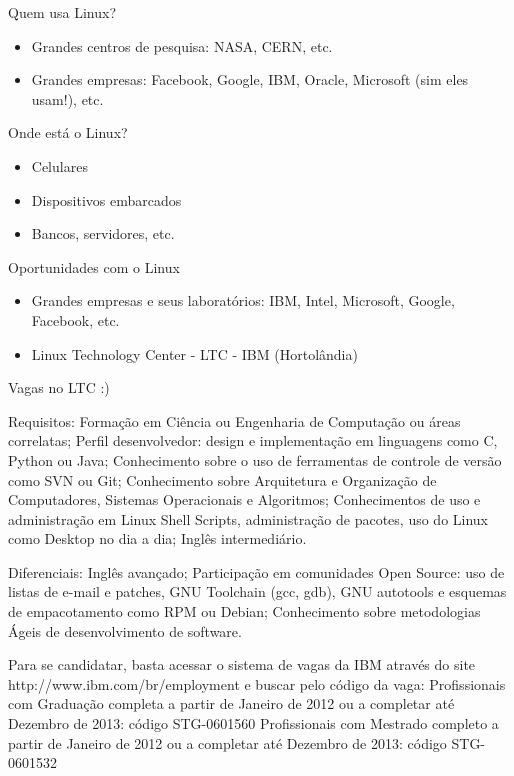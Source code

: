 \documentclass{beamer}
\begin{document}
\begin{frame}{Quem usa Linux?}
\begin{itemize}
 \item Grandes centros de pesquisa: NASA, CERN, etc.
 \item Grandes empresas: Facebook, Google, IBM, Oracle, Microsoft (sim eles usam!), etc.
\end{itemize}

\end{frame}

\begin{frame}{Onde est\'a o Linux?}
\begin{itemize}
 \item Celulares
 \item Dispositivos embarcados
 \item Bancos, servidores, etc.
\end{itemize}

\end{frame}

\begin{frame}{Oportunidades com o Linux}

\begin{itemize}
 \item Grandes empresas e seus laborat\'orios: IBM, Intel, Microsoft, Google, Facebook, etc.
 \item Linux Technology Center - LTC - IBM (Hortol\^andia)
\end{itemize}
 

\end{frame}

\begin{frame}
 
Vagas no LTC :) 


Requisitos:
Formação em Ci\^encia ou Engenharia de Computa\c{c}\~ao ou \'areas correlatas;
Perfil desenvolvedor: design e implementa\c{c}\~ao em linguagens como C, Python ou Java;
Conhecimento sobre o uso de ferramentas de controle de versão como SVN ou Git;
Conhecimento sobre Arquitetura e Organiza\c{c}\~ao de Computadores, Sistemas Operacionais e Algoritmos;
Conhecimentos de uso e administra\c{c}\~ao em Linux \-\- Shell Scripts, administra\c{c}\~ao de pacotes, uso do Linux como Desktop no dia a dia;
Ingl\^es intermedi\'ario.


Diferenciais:
Ingl\^es avan\c{c}ado;
Participa\c{c}\~ao em comunidades Open Source: uso de listas de e-mail e patches, GNU Toolchain (gcc, gdb), GNU autotools e esquemas de empacotamento como RPM ou Debian;
Conhecimento sobre metodologias \'Ageis de desenvolvimento de software.


Para se candidatar, basta acessar o sistema de vagas da IBM através do site http://www.ibm.com/br/employment  e buscar pelo c\'odigo da vaga:
Profissionais com Gradua\c{c}\~ao completa a partir de Janeiro de 2012 ou a completar at\'e Dezembro de 2013: c\'odigo STG-0601560
Profissionais com Mestrado completo a partir de Janeiro de 2012 ou a completar at\'e Dezembro de 2013: c\'odigo STG-0601532
\end{frame}
\end{document}

